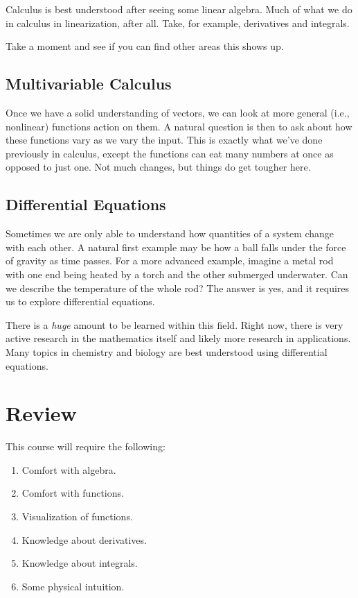     Calculus is best understood after seeing some linear algebra.  Much of what we do in calculus in linearization, after all. Take, for example,  derivatives and integrals. 
    \begin{remark}
    Take a moment and see if you can find other areas this shows up.
    \end{remark}
    
    
    \subsection{Multivariable Calculus}
    Once we have a solid understanding of vectors, we can look at more general (i.e., nonlinear) functions action on them.  A natural question is then to ask about how these functions vary as we vary the input.  This is exactly what we've done previously in calculus, except the functions can eat many numbers at once as opposed to just one.  Not much changes, but things do get tougher here.
    
    
    \subsection{Differential Equations}
    Sometimes we are only able to understand how quantities of a system change with each other.  A natural first example may be how a ball falls under the force of gravity as time passes. For a more advanced example, imagine a metal rod with one end being heated by a torch and the other submerged underwater.  Can we describe the temperature of the whole rod?  The answer is yes, and it requires us to explore differential equations.
    
    There is a \emph{huge} amount to be learned within this field.  Right now, there is very active research in the mathematics itself and likely more research in applications.  Many topics in chemistry and biology are best understood using differential equations.

    
    \section{Review}
    This course will require the following:
    \begin{enumerate}[1.]
        \item Comfort with algebra.
        \item Comfort with functions.
        \item Visualization of functions.
        \item Knowledge about derivatives.
        \item Knowledge about integrals.
        \item Some physical intuition.
    \end{enumerate}
    
